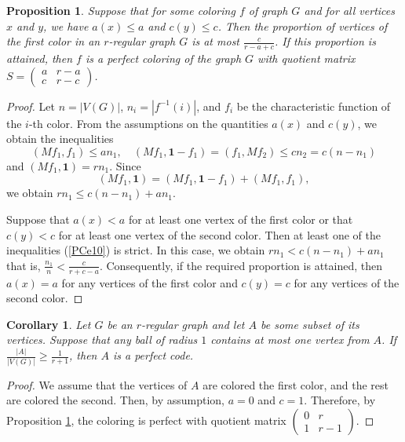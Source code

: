 \documentclass[11pt]{article}
\newtheorem{claim}{Proposition}[section]
\newtheorem{corollary}{Corollary}[section]
\theoremstyle{definition}
\begin{document}
\begin{claim}\label{PCclaim10}
Suppose that for some coloring $f$ of graph $G$ and for all  vertices $x$
and $y$, we have $a(x)\leq a$ and $c(y)\leq c$. Then the proportion of vertices
of the first color in an $r$-regular graph $G$ is at most
$\frac{c}{r-a+c}$. If this proportion is attained, then $f$
is a perfect coloring of the graph $G$ with quotient matrix $S=\begin{pmatrix}
a & r-a \\
c & r-c
\end{pmatrix}$.
\end{claim}
\begin{proof}
Let $n=|V(G)|$, $n_i=|f^{-1}(i)|$, and $f_i$ be the characteristic
function of the $i$-th color. From the assumptions on the quantities $a(x)$ and $c(y)$, we obtain the inequalities
\begin{equation}\label{PCe10}
(Mf_1,f_1)\leq an_1,\quad (Mf_1, \mathbf {1} - f_1)=(f_1, Mf_2)
\leq cn_2= c(n-n_1)
\end{equation}
and $(Mf_1,\mathbf {1})=rn_1$.
Since $$
(Mf_1,\mathbf{1})=(Mf_1, \mathbf{1} - f_1)+(Mf_1,f_1), $$ we  obtain 
$rn_1\leq 
c(n-n_1)+an_1$.


Suppose that $a(x)< a$ for at least one vertex of the first color  or that $c(y)<c$
for at least one vertex of the second color. Then at least  one of the
inequalities (\ref{PCe10}) is strict.
In this case, we obtain $rn_1<
c(n-n_1)+an_1$ that is, $\frac{n_1}{n}< \frac{c}{r+c-a}$. Consequently, if the required proportion is attained, then $a(x)= a$ for
any vertices of the first color and $c(y)=c$ for any vertices of the second
color.
\end{proof}

\begin{corollary}
Let $G$ be an $r$-regular graph and let  $A$ be some subset of its
vertices. Suppose that any ball of radius $1$ contains at most one
vertex from $A$. If $\frac{|A|}{|V(G)|}\geq \frac{1}{r+1}$, then $A$
is a perfect code.
\end{corollary}
\begin{proof}
We assume that the vertices of $A$ are colored the first color, and
the rest are colored the second. Then, by assumption, $a=0$ and $c=1$.  Therefore, by Proposition \ref{PCclaim10}, the coloring
is perfect with quotient matrix $\begin{pmatrix}
0 & r \\
1 & r-1
\end{pmatrix}$.
\end{proof}
\end{document}
